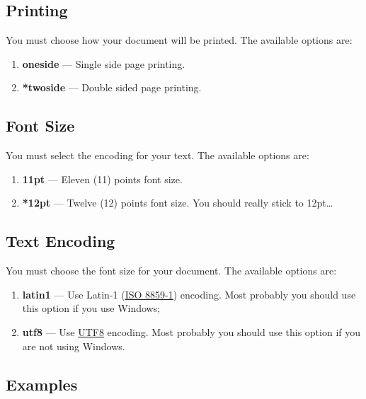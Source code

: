 \subsection{Printing}
\label{sub:printing}

You must choose how your document will be printed. The available options are:
\begin{enumerate}
  \item \textbf{oneside} --- Single side page printing.
  \item \textbf{*twoside} --- Double sided page printing.
\end{enumerate}

\subsection{Font Size}
\label{ssec:font_size}

You must select the encoding for your text. The available options are:
\begin{enumerate}
  \item \textbf{11pt} --- Eleven (11) points font size.
  \item \textbf{*12pt} --- Twelve (12) points font size. You should really stick to 12pt\ldots
\end{enumerate}

\subsection{Text Encoding}
\label{ssec:text_encoding}

You must choose the font size for your document. The available options are:
\begin{enumerate}
  \item \textbf{latin1} --- Use Latin-1 (\href{http://en.wikipedia.org/wiki/ISO/IEC_8859-1}{ISO 8859-1}) encoding.  Most probably you should use this option if you use Windows;
  \item \textbf{utf8} --- Use \href{http://en.wikipedia.org/wiki/UTF-8}{UTF8} encoding.    Most probably you should use this option if you are not using Windows.
\end{enumerate}

\subsection{Examples}
\label{ssec:examples}

